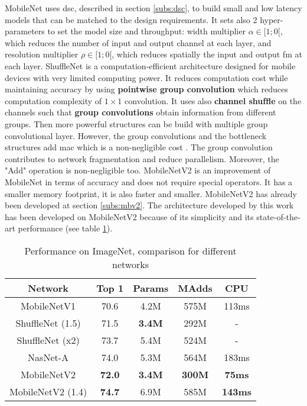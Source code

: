 %
MobileNet \cite{howard_mobilenets_2017} uses \acrshort{dsc}, described in section \ref{subs:dsc}, to build small and low latency models that can be matched to the design requirements. It sets also 2 hyper-parameters to set the model size and throughput: width multiplier $\alpha \in [1; 0[$, which reduces the number of input and output channel at each layer, and resolution multiplier $\rho \in [1; 0[$,  which reduces spatially the input and output \acrshort{fm} at each layer.\newline \newline
%
ShuffleNet \cite{zhang_shufflenet_2018} is a computation-efficient architecture designed for mobile devices with very limited computing power. It reduces computation cost while maintaining accuracy by using \textbf{pointwise group convolution} which reduces computation complexity of $1 \times 1$ convolution. It uses also \textbf{channel shufﬂe} on the channels such that \textbf{group convolutions} obtain information from different groups. Then more powerful structures can be build with multiple group convolutional layer. However, the group convolutions and the bottleneck structures add \acrshort{mac} which is a non-negligible cost \cite{ma_shufflenet_2018}. The group convolution contributes to network fragmentation and reduce parallelism. Moreover, the "Add" operation is non-negligible too. \newline \newline
%
MobileNetV2 \cite{sandler_mobilenetv2_2019} is an improvement of MobileNet in terms of accuracy and does not require special operators. It has a smaller memory footprint, it is also faster and smaller. MobileNetV2 has already been developed at section \ref{subs:mbv2}. The architecture developed by this work has been developed on MobileNetV2 because of its simplicity and its state-of-the-art performance (see table \ref{tab:mbv2}).
%
\begin{table}
    \center
    \begin{tabular}{ | c | c | c c | c| }
        \hline \hline
        Network & Top 1 & Params & MAdds & CPU \\
        \hline \hline
        MobileNetV1 & 70.6 & 4.2M & 575M & 113ms \\
        ShuffleNet (1.5) & 71.5 & \textbf{3.4M} & 292M & - \\
        ShuffleNet (x2)  & 73.7 & 5.4M & 524M & - \\
        NasNet-A & 74.0 & 5.3M & 564M & 183ms \\
        \hline
        MobileNetV2 & \textbf{72.0} & \textbf{3.4M} & \textbf{300M} & \textbf{75ms} \\
        MobileNetV2 (1.4) & \textbf{74.7} & 6.9M & 585M & \textbf{143ms} \\
        \hline \hline
    \end{tabular}
    \caption{Performance on ImageNet, comparison for different networks \cite{sandler_mobilenetv2_2019}}
    \label{tab:mbv2}
\end{table}
